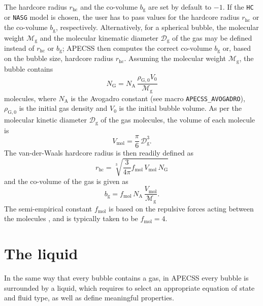 The hardcore radius $r_\mathrm{hc}$ and the co-volume $b_\mathrm{g}$ are set by default to $-1$. If the {\tt HC} or {\tt NASG} model is chosen, the user has to pass values for the hardcore radius $r_\mathrm{hc}$ or the co-volume $b_\mathrm{g}$, respectively. Alternatively, for a spherical bubble, the molecular weight $\mathcal{M}_{\text{g}}$ and the molecular kinematic diameter $\mathcal{D}_{\text{g}}$ of the gas may be defined instead of $r_\mathrm{hc}$ or $b_\mathrm{g}$; APECSS then computes the correct co-volume $b_\mathrm{g}$ or, based on the bubble size, hardcore radius $r_\mathrm{hc}$. Assuming the molecular weight $\mathcal{M}_{\text{g}}$, the bubble contains 
\begin{equation}
    N_\mathrm{G} = N_\mathrm{A} \, \frac{\rho_{\mathrm{G},0} V_0}{\mathcal{M}_{\text{g}}} 
\end{equation}
molecules, where $N_\mathrm{A}$ is the Avogadro constant (see macro {\tt APECSS\_AVOGADRO}), $\rho_{\mathrm{G},0}$ is the initial gas density and $V_0$ is the initial bubble volume. As per the molecular kinetic diameter $\mathcal{D}_{\text{g}}$ of the gas molecules, the volume of each molecule is
\begin{equation}
    V_\mathrm{mol} = \frac{\pi}{6} \, \mathcal{D}_{\text{g}}^3.
\end{equation}
The van-der-Waals hardcore radius is then readily defined as
\begin{equation}
    r_\mathrm{hc} = \sqrt[3]{\frac{3}{4 \pi} f_\mathrm{mol} \, V_\mathrm{mol} \, N_\mathrm{G}}
\end{equation}
and the co-volume of the gas is given as
\begin{equation}
    b_\mathrm{g} = f_\mathrm{mol} \, N_\mathrm{A} \, \frac{V_\mathrm{mol}}{\mathcal{M}_{\text{g}}}.
\end{equation}
The semi-empirical constant $f_\mathrm{mol}$ is based on the repulsive forces acting between the molecules \citep{Kontogeorgis2019}, and is typically taken to be $f_\mathrm{mol}=4$.


\section{The liquid}
\label{sec:liquid}

In the same way that every bubble contains a gas, in APECSS every bubble is surrounded by a liquid, which requires to select an appropriate equation of state and fluid type, as well as define meaningful properties.

\vspace{0.8em}

